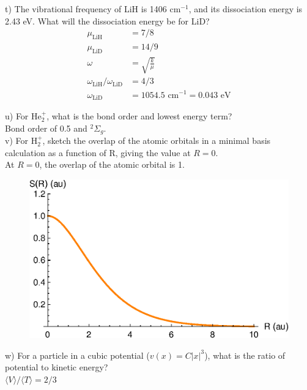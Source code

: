 \documentclass{article}
\begin{document}
\noindent t) The vibrational frequency of LiH is 1406 cm$^{-1}$, and its dissociation
energy is 2.43 eV. What will the dissociation energy be for LiD?
\\

{\color{blue}
  \begin{align*}
    \mu_{\text{LiH}} & = 7/8 \\
    \mu_{\text{LiD}} & = 14/9 \\
    \omega & = \sqrt{\frac{k}{\mu}} \\
    \omega_{\text{LiH}}/\omega_{\text{LiD}} & = 4/3 \\
    \omega_{\text{LiD}} & = 1054.5 \text{ cm}^{-1} = 0.043 \text{ eV}
  \end{align*}
}

\noindent u) For He$_2^+$, what is the bond order and lowest energy term?
\\

{\color{blue} Bond order of 0.5 and $^2\Sigma_g$.}
\\

\noindent v) For H$_2^+$, sketch the overlap of the atomic orbitals in a minimal basis
calculation as a function of R, giving the value at $R=0$.
\\

{\color{blue} At $R=0$, the overlap of the atomic orbital is 1.}
\begin{figure}[H]
  \centering
  \includegraphics[scale=0.75]{h2.eps}
  \label{fig:overlap}
\end{figure}

\noindent w) For a particle in a cubic potential ($v(x) = C|x|^3$), what is the ratio
of potential to kinetic energy?
\\

{\color{blue} $\langle V\rangle/\langle T \rangle = 2/3$}
\\
\end{document}
